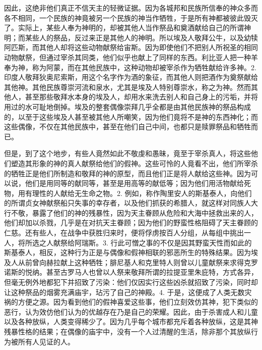 因此，这绝非他们真正不信天主的轻微证据。因为各城邦和民族所信奉的神众多而各不相同，一个民族的神竟被另一个民族的神当作牺牲，于是所有神都被彼此毁灭了。实际上，某些人奉为神明的，却被其他人当作祭品和奠酒献给自己的所谓神明；而某些人的祭品，反过来正是其他人的神明。所以埃及人敬拜公牛，以及幼犊阿匹斯，而其他人却将这些动物献祭给宙斯。因为即使他们不把别人所祝圣的相同动物献祭，但通过宰杀其同类，他们似乎也献上了同样的东西。利比亚人把一种羊奉为神，称为阿蒙，而在其他民族中，这种动物却被宰杀作为牺牲献给许多神。2. 印度人敬拜狄奥尼索斯，用这个名字作为酒的象征，而其他人则把酒作为奠祭献给其他神。其他民族尊崇河流和泉水，尤其是埃及人特别尊崇水，称之为神。然而其他人，甚至那些敬拜水本身的埃及人，却用水来洗去别人和自己身上的污垢，并将用过的水可耻地倒掉。埃及的整套偶像崇拜几乎全都是由其他民族神的祭品构成的，以至于这些埃及人甚至被其他人所嘲笑，因为他们竟将不是神的东西神化；而这些偶像，不仅在其他民族中，甚至在他们自己中间，也都只是赎罪祭品和牺牲而已。\par

\par

但是，到了这个地步，有些人竟然如此不敬虔和愚昧，竟至于宰杀真人，将这些他们塑造其形象的神的真人献祭给他们的假神。这些可怜的人竟看不出，他们所宰杀的牺牲正是他们所制造和敬拜的神的原型，而且他们正是将人献给这些神。因为可以说，他们是用同等的献同等，甚至是用高等的献低等；因为他们用活物献给死物，用有理性的人献给无生命之物。2. 例如，称作陶里安人的斯基泰人，向他们的所谓贞女神献祭船只失事的幸存者，以及他们抓获的希腊人，就这样对同族人大行不敬，暴露了他们的神的残暴性，因为天主眷顾从危险和大海中拯救出来的人，他们却加以杀戮，几乎是在对抗天主眷顾；因为他们的野蛮性格阻碍了天主眷顾的仁慈。还有些人，在战争中获胜归来时，便将俘虏按百人分组，从每组中挑出一人，将所选之人献祭给阿瑞斯。3. 行此可憎之事的不仅是因其野蛮天性而如此的斯基泰人，相反，这种行为正是与偶像和假神相联的邪恶所生的特殊结果。因为埃及人从前曾向赫拉献上这种牺牲；腓尼基人和克里特人则曾以儿童献祭来求得克罗诺斯的悦纳。甚至古罗马人也曾以人祭来敬拜所谓的拉提亚里朱庇特，方式各异，但毫无例外地都犯下并招致了污染：他们仅因实行这些凶杀就招致了污染，同时却让这种祭品的烟雾充满庙宇，玷污了自己的神殿。4. 于是，这便成了人类无数灾祸的方便之源。因为看到他们的假神喜爱这些事，他们立刻效仿其神，犯下类似的恶行，认为效仿他们认为的优越存在乃是自己的荣耀。因此，由于杀害成人和儿童以及各种放纵，人类变得稀少了。因为几乎每个城市都充斥着各种放纵，这是其神残暴性格的结果；在偶像的庙宇中，没有一个人过清醒的生活，除非那个其放纵行为被所有人见证的人。\par

